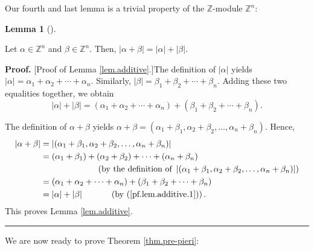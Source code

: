 \documentclass
[numbers=enddot,12pt,final,onecolumn,notitlepage,english]{scrartcl}%
\theoremstyle{definition}
\newtheorem{lem}[theo]{Lemma}
\newenvironment{lemma}[1][]
{\begin{lem}[#1]\begin{leftbar}}
{\end{leftbar}\end{lem}}
\newenvironment{proof}[1][Proof]{\noindent\textbf{#1.} }{\ \rule{0.5em}{0.5em}}
\newenvironment{verlong}{}{}
\begin{document}
Our fourth and last lemma is a trivial property of the $\mathbb{Z}$-module
$\mathbb{Z}^{n}$:

\begin{lemma}
\label{lem.additive}Let $\alpha\in\mathbb{Z}^{n}$ and $\beta\in\mathbb{Z}^{n}%
$. Then, $\left\vert \alpha+\beta\right\vert =\left\vert \alpha\right\vert
+\left\vert \beta\right\vert $.
\end{lemma}

\begin{verlong}
\begin{proof}
[Proof of Lemma \ref{lem.additive}.]The definition of $\left\vert
\alpha\right\vert $ yields $\left\vert \alpha\right\vert =\alpha_{1}%
+\alpha_{2}+\cdots+\alpha_{n}$. Similarly, $\left\vert \beta\right\vert
=\beta_{1}+\beta_{2}+\cdots+\beta_{n}$. Adding these two equalities together,
we obtain%
\begin{equation}
\left\vert \alpha\right\vert +\left\vert \beta\right\vert =\left(  \alpha
_{1}+\alpha_{2}+\cdots+\alpha_{n}\right)  +\left(  \beta_{1}+\beta_{2}%
+\cdots+\beta_{n}\right)  . \label{pf.lem.additive.1}%
\end{equation}


The definition of $\alpha+\beta$ yields $\alpha+\beta=\left(  \alpha_{1}%
+\beta_{1},\alpha_{2}+\beta_{2},\ldots,\alpha_{n}+\beta_{n}\right)  $. Hence,%
\begin{align*}
\left\vert \alpha+\beta\right\vert  &  =\left\vert \left(  \alpha_{1}%
+\beta_{1},\alpha_{2}+\beta_{2},\ldots,\alpha_{n}+\beta_{n}\right)
\right\vert \\
&  =\left(  \alpha_{1}+\beta_{1}\right)  +\left(  \alpha_{2}+\beta_{2}\right)
+\cdots+\left(  \alpha_{n}+\beta_{n}\right) \\
&  \ \ \ \ \ \ \ \ \ \ \ \ \ \ \ \ \ \ \ \ \left(  \text{by the definition of
}\left\vert \left(  \alpha_{1}+\beta_{1},\alpha_{2}+\beta_{2},\ldots
,\alpha_{n}+\beta_{n}\right)  \right\vert \right) \\
&  =\left(  \alpha_{1}+\alpha_{2}+\cdots+\alpha_{n}\right)  +\left(  \beta
_{1}+\beta_{2}+\cdots+\beta_{n}\right) \\
&  =\left\vert \alpha\right\vert +\left\vert \beta\right\vert
\ \ \ \ \ \ \ \ \ \ \left(  \text{by (\ref{pf.lem.additive.1})}\right)  .
\end{align*}
This proves Lemma \ref{lem.additive}.
\end{proof}
\end{verlong}

We are now ready to prove Theorem \ref{thm.pre-pieri}:
\end{document}
